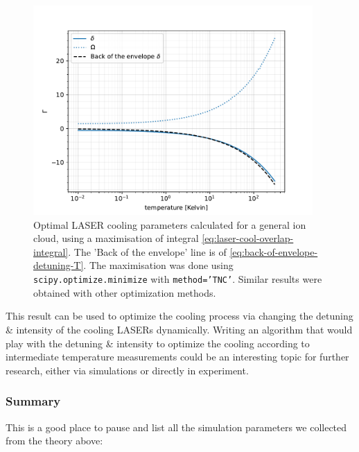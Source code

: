 \begin{figure}
	\begin{center}
		\includegraphics[width=0.95\textwidth]{graphics/laser_cool_overlap.pdf}
	\end{center}
	\caption{Optimal LASER cooling parameters calculated for a general ion cloud, using a maximisation of integral \ref{eq:laser-cool-overlap-integral}. The 'Back of the envelope' line is of \ref{eq:back-of-envelope-detuning-T}. The maximisation was done using \texttt{scipy.optimize.minimize} with \texttt{method='TNC'}. Similar results were obtained with other optimization methods.}\label{fig:laser-cool-optimal-overlap}
\end{figure}

This result can be used to optimize the cooling process via changing the detuning \& intensity of the cooling LASERs dynamically. Writing an algorithm that would play with the detuning \& intensity to optimize the cooling according to intermediate temperature measurements could be an interesting topic for further research, either via simulations or directly in experiment.

\subsubsection{Summary}\label{sssec:cooling-summary}

This is a good place to pause and list all the simulation parameters we collected from the theory above:

